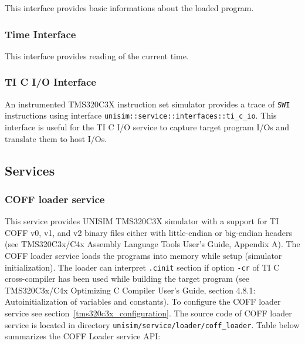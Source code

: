 This interface provides basic informations about the loaded program.

\begin{center}
	
\end{center}

\subsubsection{Time Interface}

This interface provides reading of the current time.

\begin{center}
	
\end{center}

\subsubsection{TI C I/O Interface}

An instrumented TMS320C3X instruction set simulator provides a trace of \texttt{SWI} instructions using interface \texttt{unisim::service::interfaces::ti\_c\_io}.
This interface is useful for the TI C I/O service to capture target program I/Os and translate them to host I/Os.

\begin{center}
	
\end{center}

\newpage
\subsection{Services}
\subsubsection{COFF loader service}
\label{tms320c3x_coff_loader}

This service provides UNISIM TMS320C3X simulator with a support for TI COFF v0, v1, and v2 binary files  either with little-endian or big-endian headers (see TMS320C3x/C4x Assembly Language Tools User’s Guide, Appendix A). The COFF loader service loads the programs into memory while setup (simulator initialization). The loader can interpret \texttt{.cinit} section if option \texttt{-cr} of TI C cross-compiler has been used while building the target program (see TMS320C3x/C4x Optimizing C Compiler User’s Guide, section 4.8.1: Autoinitialization of variables and constants).
To configure the COFF loader service see section~\ref{tms320c3x_configuration}.
The source code of COFF loader service is located in directory \texttt{unisim/service/loader/coff\_loader}.
\noindent Table below summarizes the COFF Loader service API:

